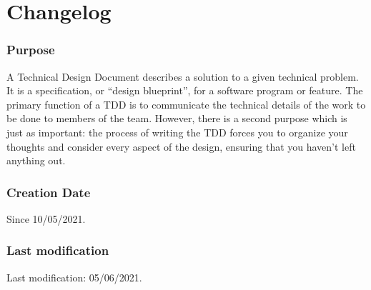 \section{Changelog}

\subsubsection*{Purpose}
A Technical Design Document describes a solution to a given technical problem. It is a specification, or “design blueprint”, for a software program or feature. The primary function of a TDD is to communicate the technical details of the work to be done to members of the team. However, there is a second purpose which is just as important: the process of writing the TDD forces you to organize your thoughts and consider every aspect of the design, ensuring that you haven’t left anything out.

\subsubsection*{Creation Date}
Since 10/05/2021.

\subsubsection*{Last modification}
Last modification: 05/06/2021.\\

